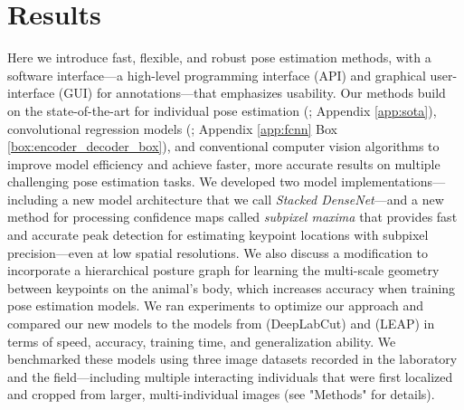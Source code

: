 \documentclass[11pt,a4paper,oneside]{book}
\begin{document}
\section{Results}
Here we introduce fast, flexible, and robust pose estimation methods, with a software interface---a high-level programming interface (API) and graphical user-interface (GUI) for annotations---that emphasizes usability. Our methods build on the state-of-the-art for individual pose estimation (\citealt{newell2016}; Appendix \ref{app:sota}), convolutional regression models (\citealt{Jegou16}; Appendix \ref{app:fcnn} Box \ref{box:encoder_decoder_box}), and conventional computer vision algorithms \citep{guizar2008efficient} to improve model efficiency and achieve faster, more accurate results on multiple challenging pose estimation tasks. We developed two model implementations—including a new model architecture that we call \textit{Stacked DenseNet}—and a new method for processing confidence maps called \textit{subpixel maxima} that provides fast and accurate peak detection for estimating keypoint locations with subpixel precision—even at low spatial resolutions. We also discuss a modification to incorporate a hierarchical posture graph for learning the multi-scale geometry between keypoints on the animal's body, which increases accuracy when training pose estimation models. We ran experiments to optimize our approach and compared our new models to the models from \cite{mathis2018deeplabcut} (DeepLabCut) and \cite{pereira2019fast} (LEAP) in terms of speed, accuracy, training time, and generalization ability. We benchmarked these models using three image datasets recorded in the laboratory and the field—including multiple interacting individuals that were first localized and cropped from larger, multi-individual images (see "Methods" for details). 
\end{document}
